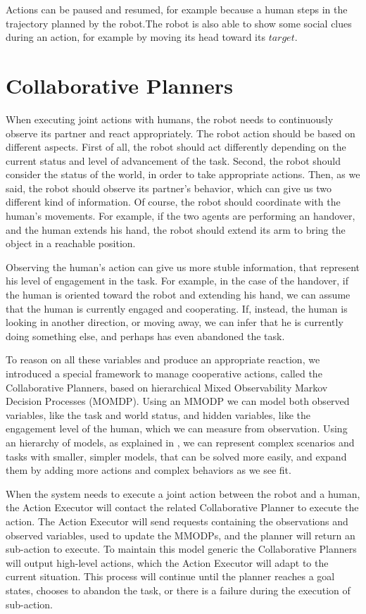 Actions can be paused and resumed, for example because a human steps in the trajectory planned by the robot.The robot is also able to show some social clues during an action, for example by moving its head toward its $target$. 

\section{Collaborative Planners} 
\label{sec:plan_execution-collaborative_planners}
When executing joint actions with humans, the robot needs to continuously observe its partner and react appropriately. The robot action should be based on different aspects. First of all, the robot should act differently depending on the current status and level of advancement of the task. Second, the robot should consider the status of the world, in order to take appropriate actions. Then, as we said, the robot should observe its partner's behavior, which can give us two different kind of information. Of course, the robot should coordinate with the human's movements. For example, if the two agents are performing an handover, and the human extends his hand, the robot should extend its arm to bring the object in a reachable position.

Observing the human's action can give us more stuble information, that represent his level of engagement in the task. For example, in the case of the handover, if the human is oriented toward the robot and extending his hand, we can assume that the human is currently engaged and cooperating. If, instead, the human is looking in another direction, or moving away, we can infer that he is currently doing something else, and perhaps has even abandoned the task.

To reason on all these variables and produce an appropriate reaction, we introduced a special framework to manage cooperative actions, called the Collaborative Planners, based on hierarchical Mixed Observability Markov Decision Processes (MOMDP). Using an MMODP we can model both observed variables, like the task and world status, and hidden variables, like the engagement level of the human, which we can measure from observation. Using an hierarchy of models, as explained in \cite{pineau2001hierarchical}, we can represent complex scenarios and tasks with smaller, simpler models, that can be solved more easily, and expand them by adding more actions and complex behaviors as we see fit.

When the system needs to execute a joint action between the robot and a human, the Action Executor will contact the related Collaborative Planner to execute the action. The Action Executor will send requests containing the observations and observed variables, used to update the MMODPs, and the planner will return an sub-action to execute. To maintain this model generic the Collaborative Planners will output high-level actions, which the Action Executor will adapt to the current situation. This process will continue until the planner reaches a goal states, chooses to abandon the task, or there is a failure during the execution of sub-action.

